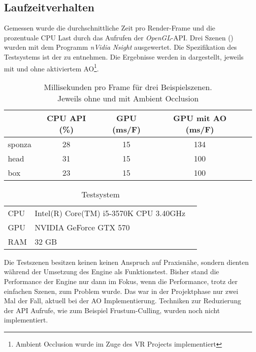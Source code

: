 \subsection{Laufzeitverhalten}\label{sec:laufzeit-impl}

Gemessen wurde die durchschnittliche Zeit pro Render-Frame und die prozentuale CPU Last durch das Aufrufen der \textit{OpenGL}-\ac{API}. Drei Szenen () wurden mit dem Programm \textit{nVidia Nsight} ausgewertet. Die Spezifikation des Testsystems ist der  zu entnehmen. Die Ergebnisse werden in  dargestellt, jeweils mit und ohne aktiviertem \ac{AO}\footnote{Ambient Occlusion wurde im Zuge des VR Projects implementiert}.


\begin{table}[h]
\centering
\begin{tabular}{@{}lcccc@{}}
\toprule
       & CPU API (\%) & GPU (ms/F) & GPU mit \ac{AO} (ms/F) & \\ \midrule
sponza & 28  		  &  15  & 134  &  \\
head   & 31    		  &  15  & 100  &  \\
box    & 23    		  &  15  & 100  &  \\ \bottomrule
\end{tabular}
\caption{Millisekunden pro Frame für drei Beispielszenen.\\Jeweils ohne und mit Ambient Occlusion}\label{tab:performance}
\end{table}

\begin{table}[h]
\centering
\begin{tabular}{@{}llc@{}}
\toprule
CPU &  Intel(R) Core(TM) i5-3570K CPU \@ 3.40GHz  & \\
GPU &  NVIDIA GeForce GTX 570  & \\
RAM &  32 GB  & \\ \bottomrule
\end{tabular}
\caption{Testsystem}\label{tab:spec-system}
\end{table}

Die Testszenen besitzen keinen keinen Anspruch auf Praxisnähe, sondern dienten während der Umsetzung des Engine als Funktionstest. Bisher stand die Performance der Engine nur dann im Fokus, wenn die Performance, trotz der einfachen Szenen, zum Problem wurde. Das war in der Projektphase nur zwei Mal der Fall, aktuell bei der \ac{AO} Implementierung. Techniken zur Reduzierung der API Aufrufe, wie zum Beispiel Frustum-Culling, wurden noch nicht implementiert.

